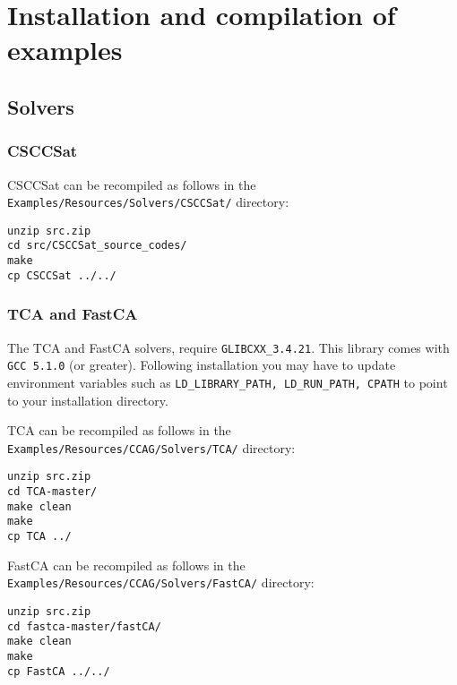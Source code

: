 \documentclass{article}
\begin{document}
\section{Installation and compilation of examples}

\subsection{Solvers}

\subsubsection{CSCCSat}
CSCCSat can be recompiled as follows in the \texttt{Examples/Resources/Solvers/CSCCSat/} directory:
\begin{Verbatim}[frame=single]
unzip src.zip
cd src/CSCCSat_source_codes/
make
cp CSCCSat ../../
\end{Verbatim}

\subsubsection{TCA and FastCA}
The TCA and FastCA solvers, require \texttt{GLIBCXX\_3.4.21}. This library comes with \texttt{GCC 5.1.0} (or greater). Following installation you may have to update environment variables such as \texttt{LD\_LIBRARY\_PATH, LD\_RUN\_PATH, CPATH} to point to your installation directory.

TCA can be recompiled as follows in the \texttt{Examples/Resources/CCAG/Solvers/TCA/} directory:
\begin{Verbatim}[frame=single]
unzip src.zip
cd TCA-master/
make clean
make
cp TCA ../
\end{Verbatim}

FastCA can be recompiled as follows in the \texttt{Examples/Resources/CCAG/Solvers/FastCA/} directory:
\begin{Verbatim}[frame=single]
unzip src.zip
cd fastca-master/fastCA/
make clean
make
cp FastCA ../../
\end{Verbatim}
\end{document}
